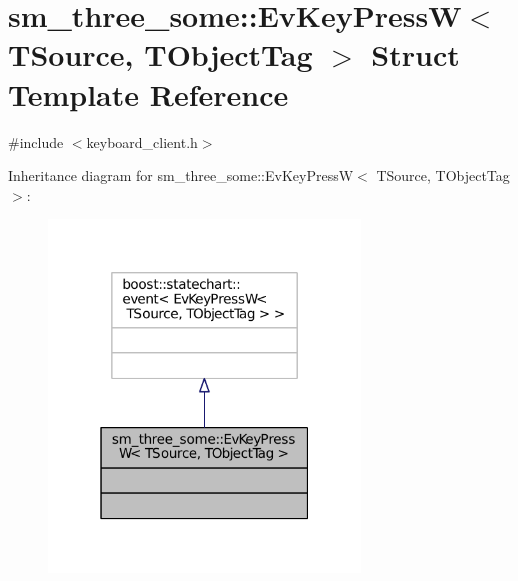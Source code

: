 \hypertarget{structsm__three__some_1_1EvKeyPressW}{}\section{sm\+\_\+three\+\_\+some\+:\+:Ev\+Key\+PressW$<$ T\+Source, T\+Object\+Tag $>$ Struct Template Reference}
\label{structsm__three__some_1_1EvKeyPressW}


{\ttfamily \#include $<$keyboard\+\_\+client.\+h$>$}



Inheritance diagram for sm\+\_\+three\+\_\+some\+:\+:Ev\+Key\+PressW$<$ T\+Source, T\+Object\+Tag $>$\+:
\nopagebreak
\begin{figure}[H]
\begin{center}
\leavevmode
\includegraphics[width=235pt]{structsm__three__some_1_1EvKeyPressW__inherit__graph}
\end{center}
\end{figure}


